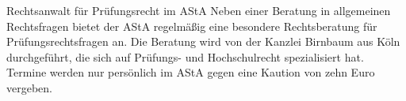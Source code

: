 \begin{artikel}{Rechtsanwalt für Prüfungsrecht im AStA}
Neben einer Beratung in allgemeinen Rechtsfragen bietet der AStA regelmäßig eine besondere Rechtsberatung für Prüfungsrechtsfragen an. Die Beratung wird von der Kanzlei Birnbaum aus Köln durchgeführt, die sich auf Prüfungs- und Hochschulrecht spezialisiert hat. Termine werden nur persönlich im AStA gegen eine Kaution von zehn Euro vergeben.
\end{artikel}
